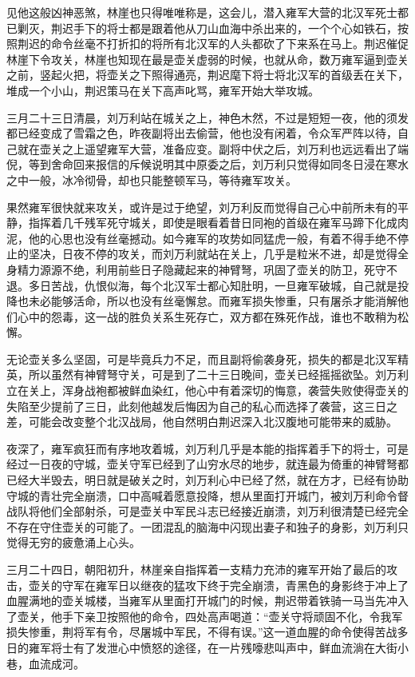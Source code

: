 见他这般凶神恶煞，林崖也只得唯唯称是，这会儿，潜入雍军大营的北汉军死士都已剿灭，荆迟手下的将士都是跟着他从刀山血海中杀出来的，一个个心如铁石，按照荆迟的命令丝毫不打折扣的将所有北汉军的人头都砍了下来系在马上。荆迟催促林崖下令攻关，林崖也知现在最是壶关虚弱的时候，也就从命，数万雍军逼到壶关之前，竖起火把，将壶关之下照得通亮，荆迟麾下将士将北汉军的首级丢在关下，堆成一个小山，荆迟策马在关下高声叱骂，雍军开始大举攻城。

三月二十三日清晨，刘万利站在城关之上，神色木然，不过是短短一夜，他的须发都已经变成了雪霜之色，昨夜副将出去偷营，他也没有闲着，令众军严阵以待，自己就在壶关之上遥望雍军大营，准备应变。副将中伏之后，刘万利也远远看出了端倪，等到舍命回来报信的斥候说明其中原委之后，刘万利只觉得如同冬日浸在寒水之中一般，冰冷彻骨，却也只能整顿军马，等待雍军攻关。

果然雍军很快就来攻关，或许是过于绝望，刘万利反而觉得自己心中前所未有的平静，指挥着几千残军死守城关，即使是眼看着昔日同袍的首级在雍军马蹄下化成肉泥，他的心思也没有丝毫撼动。如今雍军的攻势如同猛虎一般，有着不得手绝不停止的坚决，日夜不停的攻关，而刘万利就站在关上，几乎是粒米不进，却是觉得全身精力源源不绝，利用前些日子隐藏起来的神臂弩，巩固了壶关的防卫，死守不退。多日苦战，仇恨似海，每个北汉军士都心知肚明，一旦雍军破城，自己就是投降也未必能够活命，所以也没有丝毫懈怠。而雍军损失惨重，只有屠杀才能消解他们心中的怨毒，这一战的胜负关系生死存亡，双方都在殊死作战，谁也不敢稍为松懈。

无论壶关多么坚固，可是毕竟兵力不足，而且副将偷袭身死，损失的都是北汉军精英，所以虽然有神臂弩守关，可是到了二十三日晚间，壶关已经摇摇欲坠。刘万利立在关上，浑身战袍都被鲜血染红，他心中有着深切的悔意，袭营失败使得壶关的失陷至少提前了三日，此刻他越发后悔因为自己的私心而选择了袭营，这三日之差，可能会改变整个北汉战局，他自然明白荆迟深入北汉腹地可能带来的威胁。

夜深了，雍军疯狂而有序地攻着城，刘万利几乎是本能的指挥着手下的将士，可是经过一日夜的守城，壶关守军已经到了山穷水尽的地步，就连最为倚重的神臂弩都已经大半毁去，明日就是破关之时，刘万利心中已经了然，就在方才，已经有协助守城的青壮完全崩溃，口中高喊着愿意投降，想从里面打开城门，被刘万利命令督战队将他们全部射杀，可是壶关中军民斗志已经接近崩溃，刘万利很清楚已经完全不存在守住壶关的可能了。一团混乱的脑海中闪现出妻子和独子的身影，刘万利只觉得无穷的疲惫涌上心头。

三月二十四日，朝阳初升，林崖亲自指挥着一支精力充沛的雍军开始了最后的攻击，壶关的守军在雍军日以继夜的猛攻下终于完全崩溃，青黑色的身影终于冲上了血腥满地的壶关城楼，当雍军从里面打开城门的时候，荆迟带着铁骑一马当先冲入了壶关，他手下亲卫按照他的命令，四处高声喝道：“壶关守将顽固不化，令我军损失惨重，荆将军有令，尽屠城中军民，不得有误。”这一道血腥的命令使得苦战多日的雍军将士有了发泄心中愤怒的途径，在一片残嚎悲叫声中，鲜血流淌在大街小巷，血流成河。

